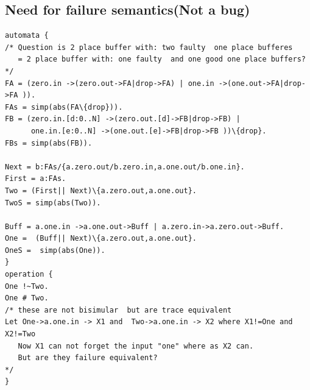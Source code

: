 \documentclass[]{article}
\begin{document}
\subsection{Need for failure semantics(Not a bug)}
\begin{verbatim}
automata {
/* Question is 2 place buffer with: two faulty  one place bufferes
   = 2 place buffer with: one faulty  and one good one place buffers?
*/
FA = (zero.in ->(zero.out->FA|drop->FA) | one.in ->(one.out->FA|drop->FA )).
FAs = simp(abs(FA\{drop})).
FB = (zero.in.[d:0..N] ->(zero.out.[d]->FB|drop->FB) |
      one.in.[e:0..N] ->(one.out.[e]->FB|drop->FB ))\{drop}.
FBs = simp(abs(FB)).

Next = b:FAs/{a.zero.out/b.zero.in,a.one.out/b.one.in}.
First = a:FAs.
Two = (First|| Next)\{a.zero.out,a.one.out}.
TwoS = simp(abs(Two)).

Buff = a.one.in ->a.one.out->Buff | a.zero.in->a.zero.out->Buff.
One =  (Buff|| Next)\{a.zero.out,a.one.out}.
OneS =  simp(abs(One)).
}
operation {
One !~Two.
One # Two.
/* these are not bisimular  but are trace equivalent
Let One->a.one.in -> X1 and  Two->a.one.in -> X2 where X1!=One and X2!=Two
   Now X1 can not forget the input "one" where as X2 can.
   But are they failure equivalent?
*/
}
\end{verbatim}


 
\end{document}
